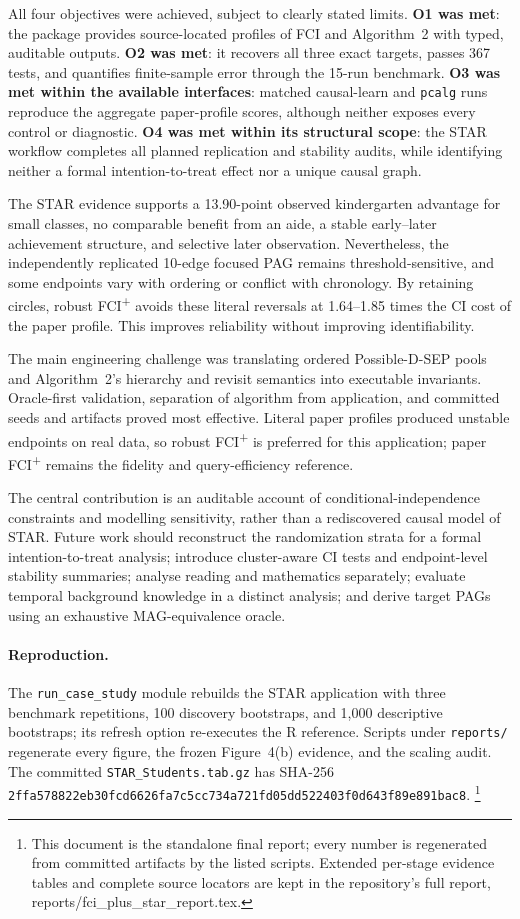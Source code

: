 \documentclass[11pt,a4paper]{article}
\theoremstyle{definition}
\newcommand{\FCIplus}{FCI\textsuperscript{+}}
\newcommand{\code}[1]{\texttt{#1}}
\newcommand{\brk}{\discretionary{}{}{}}
\begin{document}
All four objectives were achieved, subject to clearly stated limits.
\textbf{O1 was met}: the package provides source-located profiles of FCI and
Algorithm~2 with typed, auditable outputs. \textbf{O2 was met}: it recovers
all three exact targets, passes 367 tests, and quantifies finite-sample error
through the 15-run benchmark. \textbf{O3 was met within the available
interfaces}: matched causal-learn and \code{pcalg} runs reproduce the
aggregate paper-profile scores, although neither exposes every control or
diagnostic. \textbf{O4 was met within its structural scope}: the STAR
workflow completes all planned replication and stability audits, while
identifying neither a formal intention-to-treat effect nor a unique causal
graph.

The STAR evidence supports a 13.90-point observed kindergarten advantage for
small classes, no comparable benefit from an aide, a stable early--later
achievement structure, and selective later observation. Nevertheless, the
independently replicated 10-edge focused PAG remains threshold-sensitive, and
some endpoints vary with ordering or conflict with chronology. By retaining
circles, robust \FCIplus{} avoids these literal reversals at 1.64--1.85 times
the CI cost of the paper profile. This improves reliability without improving
identifiability.

The main engineering challenge was translating ordered Possible-D-SEP pools
and Algorithm~2's hierarchy and revisit semantics into executable invariants.
Oracle-first validation, separation of algorithm from application, and
committed seeds and artifacts proved most effective. Literal paper profiles
produced unstable endpoints on real data, so robust \FCIplus{} is preferred
for this application; paper \FCIplus{} remains the fidelity and
query-efficiency reference.

The central contribution is an auditable account of conditional-independence
constraints and modelling sensitivity, rather than a rediscovered causal
model of STAR. Future work should reconstruct the randomization strata for a
formal intention-to-treat analysis; introduce cluster-aware CI tests and
endpoint-level stability summaries; analyse reading and mathematics
separately; evaluate temporal background knowledge in a distinct analysis;
and derive target PAGs using an exhaustive MAG-equivalence oracle.

\paragraph{Reproduction.} The \code{run\_case\_study} module rebuilds the STAR
application with three benchmark repetitions, 100 discovery bootstraps, and
1,000 descriptive bootstraps; its refresh option re-executes the R reference.
Scripts under \code{reports/} regenerate every figure, the frozen
Figure~4(b) evidence, and the scaling audit. The committed
\code{STAR\_Students.tab.gz} has SHA-256
\code{2ffa578822eb30fcd6626fa7c5cc734a\brk 721fd05dd522403f0d643f89e891bac8}.%
\footnote{This document is the standalone final report; every number is
regenerated from committed artifacts by the listed scripts. Extended
per-stage evidence tables and complete source locators are kept in the
repository's full report, reports/fci\_plus\_star\_report.tex.}
\end{document}
